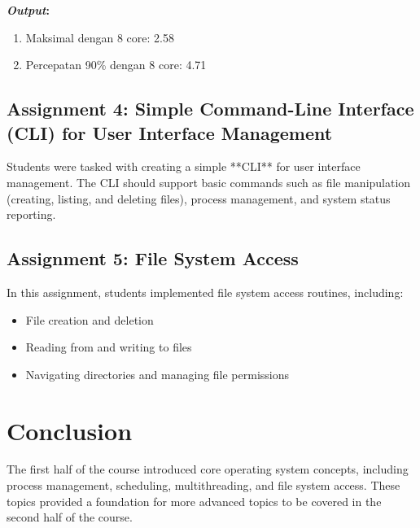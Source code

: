 \documentclass[12pt]{article}
\begin{document}
\par \textbf{\textit{Output}:}
\begin{enumerate}
    \item Maksimal dengan 8 core: 2.58
    \item Percepatan 90\% dengan 8 core: 4.71
\end{enumerate}

\subsection{Assignment 4: Simple Command-Line Interface (CLI) for User Interface Management}
Students were tasked with creating a simple **CLI** for user interface management. The CLI should support basic commands such as file manipulation (creating, listing, and deleting files), process management, and system status reporting.

\subsection{Assignment 5: File System Access}
In this assignment, students implemented file system access routines, including:
\begin{itemize}
    \item File creation and deletion
    \item Reading from and writing to files
    \item Navigating directories and managing file permissions
\end{itemize}

\section{Conclusion}
The first half of the course introduced core operating system concepts, including process management, scheduling, multithreading, and file system access. These topics provided a foundation for more advanced topics to be covered in the second half of the course.
\end{document}

